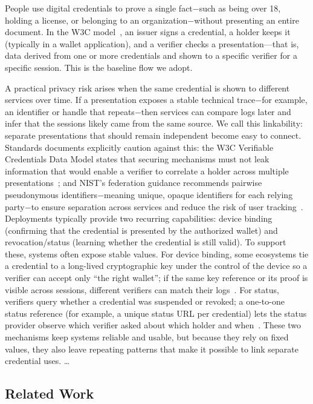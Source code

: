 People use digital credentials to prove a single fact$-$such as being over 18, holding a license, or belonging to an organization$-$without presenting an entire document. In the W3C model~\cite{w3c-vc-data-model-2}, an issuer signs a credential, a holder keeps it (typically in a wallet application), and a verifier checks a presentation—that is, data derived from one or more credentials and shown to a specific verifier for a specific session. This is the baseline flow we adopt.

A practical privacy risk arises when the same credential is shown to different services over time. If a presentation exposes a stable technical trace$-$for example, an identifier or handle that repeats$-$then services can compare logs later and infer that the sessions likely came from the same source.
We call this linkability: separate presentations that should remain independent become easy to connect. Standards documents explicitly caution against this: the W3C Verifiable Credentials Data Model states that securing mechanisms must not leak information that would enable a verifier to correlate a holder across multiple presentations~\cite{w3c-vc-data-model-2}; and NIST’s federation guidance recommends pairwise pseudonymous identifiers$-$meaning unique, opaque identifiers for each relying party$-$to ensure separation across services and reduce the risk of user tracking~\cite{nist-sp800-63c}.
Deployments typically provide two recurring capabilities: device binding (confirming that the credential is presented by the authorized wallet) and revocation/status (learning whether the credential is still valid). To support these, systems often expose stable values.
For device binding, some ecosystems tie a credential to a long-lived cryptographic key under the control of the device so a verifier can accept only “the right wallet”; if the same key reference or its proof is visible across sessions, different verifiers can match their logs~\cite{IETF:FetYasCam25}.
For status, verifiers query whether a credential was suspended or revoked; a one-to-one status reference (for example, a unique status URL per credential) lets the status provider observe which verifier asked about which holder and when~\cite{w3c-vc-data-model-2}.
These two mechanisms keep systems reliable and usable, but because they rely on fixed values, they also leave repeating patterns that make it possible to link separate credential uses.
\dots
\subsection{Related Work}

